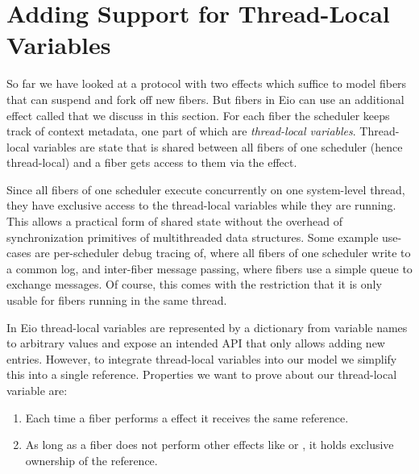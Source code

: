 \section{Adding Support for Thread-Local Variables}
\label{sec:thread-local-vars}


So far we have looked at a protocol with two effects which suffice to model fibers that can suspend and fork off new fibers.
But fibers in Eio can use an additional effect called \egetctx{} that we discuss in this section.
For each fiber the scheduler keeps track of context metadata, one part of which are \emph{thread-local variables}.
Thread-local variables are state that is shared between all fibers of one scheduler (hence thread-local) and a fiber gets access to them via the \egetctx{} effect.


Since all fibers of one scheduler execute concurrently on one system-level thread, they have exclusive access to the thread-local variables while they are running.
This allows a practical form of shared state without the overhead of synchronization primitives of multithreaded data structures.
Some example use-cases are per-scheduler debug tracing of, where all fibers of one scheduler write to a common log,
and inter-fiber message passing, where fibers use a simple queue to exchange messages.
Of course, this comes with the restriction that it is only usable for fibers running in the same thread.


In Eio thread-local variables are represented by a dictionary from variable names to arbitrary values and expose an intended API that only allows adding new entries.
However, to integrate thread-local variables into our model we simplify this into a single reference.
Properties we want to prove about our thread-local variable are:
\begin{enumerate}
    \item Each time a fiber performs a \egetctx{} effect it receives the same reference.
    \item As long as a fiber does not perform other effects like \efork{} or \esuspend{}, it holds exclusive ownership of the reference.
\end{enumerate}

